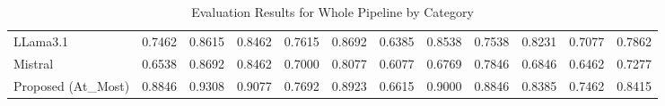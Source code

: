 \begin{table}
{\begin{tabular}{lcccccccccc||c}
            LLama3.1                           & 0.7462                                                  & 0.8615                                                  & 0.8462                                                  & 0.7615                                                            & 0.8692                                                  & 0.6385                                                    & 0.8538                                                            & 0.7538                                                  & 0.8231                                 & 0.7077                                   & 0.7862 \\
            Mistral                            & 0.6538                                                  & 0.8692                                                  & 0.8462                                                  & 0.7000                                                            & 0.8077                                                  & 0.6077                                                    & 0.6769                                                            & 0.7846                                                  & 0.6846                                 & 0.6462                                   & 0.7277 \\
            Proposed (At\_Most)                & 0.8846                                                  & 0.9308                                                  & 0.9077                                                  & 0.7692                                                            & 0.8923                                                  & 0.6615                                                    & 0.9000                                                            & 0.8846                                                  & 0.8385                                 & 0.7462                                   & 0.8415 \\
            \bottomrule
        \end{tabular}}
    \caption{Evaluation Results for Whole Pipeline by Category}
    \label{tab:evaluation_results-full-category}
\end{table}

